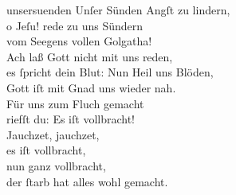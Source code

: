 \documentclass[abbrwidth=6em,tocstyle=ref-genre,toe=false]{ees}
\begin{document}
{\begin{movement}{unsersuenden}
  \voice[Chor]
  Unſer Sünden Angſt zu lindern,\\
  o Jeſu! rede zu uns Sündern\\
  vom Seegens vollen Golgatha!\\
  Ach laß Gott nicht mit uns reden,\\
  es ſpricht dein Blut: Nun Heil uns Blöden,\\
  Gott iſt mit Gnad uns wieder nah.\\
  Für uns zum Fluch gemacht\\
  riefſt du: Es iſt vollbracht!\\
  Jauchzet, jauchzet,\\
  es iſt vollbracht,\\
  nun ganz vollbracht,\\
  der ſtarb hat alles wohl gemacht.
\end{movement}
}

\eesScore
\end{document}
